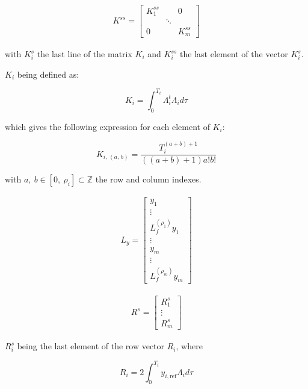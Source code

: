 \documentclass[letterpaper, 10 pt, conference]{ieeeconf}  %
\begin{document}
\begin{eqnarray}
K^{ss} = 
\left[
\begin{array}{ccc}
K^{ss}_1 & & 0\\
& \ddots &\\
0 & & K^{ss}_m
\end{array}\right]
\end{eqnarray}

with $K^{s}_i$ the last line of the matrix $K_i$ and $K^{ss}_i$ the last element of the vector $K^{s}_i$. 

$K_i$ being defined as:


\begin{equation*}
K_i = \int^{T_i}_0\Lambda_i^t\Lambda_id\tau  
\end{equation*}

which gives the following expression for each element of $K_i$:

\begin{equation*}
K_{i,\,(a,\,b)} = \frac{T_i^{(a+b)+1}}{((a+b)+1)a!b!}
\end{equation*}

with ${a,\ b \in [0,\ \rho_i] \subset \mathds{Z}}$ the row and column indexes.

\begin{eqnarray}
L_y = 
\left[\begin{array}{c}
y_1\\
\vdots\\
L_f^{(\rho_1)}y_1\\
\vdots\\
y_m\\
\vdots\\
L_f^{(\rho_m)}y_m
\end{array}\right]
\end{eqnarray}

\begin{eqnarray}
R^s = 
\left[\begin{array}{c}
R_1^s\\
\vdots\\
R_m^s
\end{array}\right]
\end{eqnarray}

${R^s_i}$ being the last element of the row vector $R_i$, where

\begin{equation}
R_i = 2\int^{T_i}_0y_{i,\text{ref}}\Lambda_id\tau
\label{eq:obstofref}
\end{equation}
\end{document}
